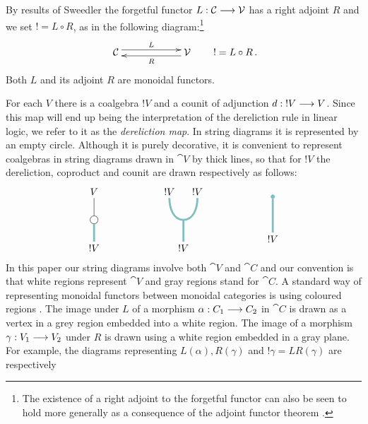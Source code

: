 \documentclass[english,letter paper,12pt,reqno]{article}
\def\drawbang{\draw[color=teal!50, line width=2pt]}
\def\dernode{\node[circle,draw=black,fill=white]}
\theoremstyle{example}
\numberwithin{equation}{section}
\begin{document}
By results of Sweedler \cite[Chapter 6]{sweedler} the forgetful functor $L: \mathcal{C} \longrightarrow \mathcal{V}$ has a right adjoint $R$ and we set ${!} = L \circ R$, as in the following diagram:\footnote{The existence of a right adjoint to the forgetful functor can also be seen to hold more generally as a consequence of the adjoint functor theorem \cite{barr}.}
\[
\xymatrix@C+3pc{
\cat{C}\ar@<0.7ex>[r]^-{L} & \cat{V} \ar@<0.7ex>[l]^-{R}
}
\qquad
! = L \circ R\,.
\]
Both $L$ and its adjoint $R$ are monoidal functors.

For each $V$ there is a coalgebra $! V$ and a counit of adjunction $d: {!} V \longrightarrow V$. Since this map will end up being the interpretation of the dereliction rule in linear logic, we refer to it as the \emph{dereliction map}. In string diagrams it is represented by an empty circle. Although it is purely decorative, it is convenient to represent coalgebras in string diagrams drawn in $\cat{V}$ by thick lines, so that for ${!} V$ the dereliction, coproduct and counit are drawn respectively as follows:
\begin{equation}\label{eq:coalgebra_maps}
\begin{tikzpicture}[scale=0.5,auto,inner sep=1mm,baseline=(current  bounding  box.center)]
\node (top) at (0,2) {$V$};
\dernode (d) at (0,0) {};
\node (banga) at (0,-2) {$!V$};
\drawbang (banga) -- (d);
\draw (d) -- (top);
\end{tikzpicture}
\qquad\qquad\qquad
\begin{tikzpicture}[scale=0.5,auto,inner sep=1mm,baseline=(current  bounding  box.center)]
\node (topl) at (-1,2) {${!} V$};
\node (topr) at (1,2) {${!} V$};
\coordinate (d) at (0,0);
\node (banga) at (0,-2) {$!V$};
\drawbang (banga) -- (d);
\drawbang[out=0,in=270] (d) to (topr);
\drawbang[out=180,in=270] (d) to (topl);
\end{tikzpicture}
\qquad\qquad\qquad
\begin{tikzpicture}[scale=0.5,auto,inner sep=1mm,baseline=(current  bounding  box.center)]
\node (banga) at (0,-2) {$!V$};
\node[circle,draw=teal!50,fill=teal!50,inner sep=0.5mm] (blah) at (0,1) {};
\drawbang (banga) -- (blah);
\end{tikzpicture}
\end{equation}
In this paper our string diagrams involve both $\cat{V}$ and $\cat{C}$ and our convention is that white regions represent $\cat{V}$ and gray regions stand for $\cat{C}$. A standard way of representing monoidal functors between monoidal categories is using coloured regions \cite[\S 5.7]{mellies}. The image under $L$ of a morphism $\alpha: C_1 \longrightarrow C_2$ in $\cat{C}$ is drawn as a vertex in a grey region embedded into a white region. The image of a morphism $\gamma: V_1 \longrightarrow V_2$ under $R$ is drawn using a white region embedded in a gray plane. For example, the diagrams representing $L(\alpha), R(\gamma)$ and ${!} \gamma = LR(\gamma)$ are respectively
\end{document}
